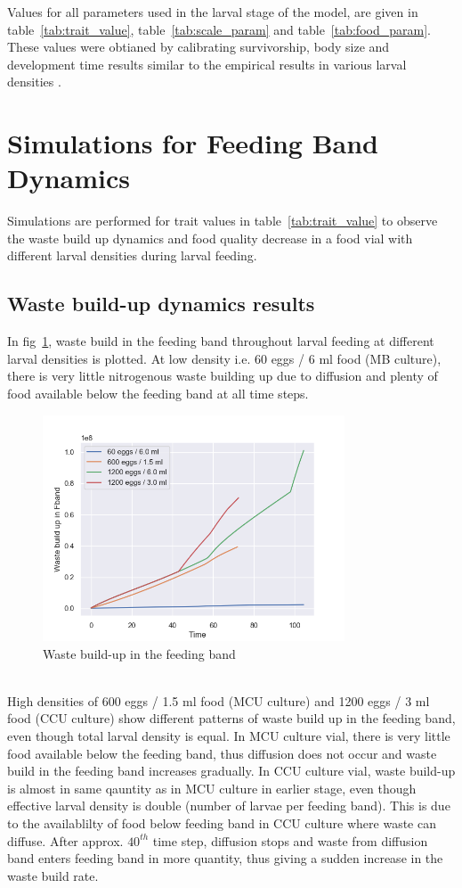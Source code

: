 \noindent Values for all parameters used in the larval stage of the model, are given in table~\ref{tab:trait_value}, table~\ref{tab:scale_param} and table~\ref{tab:food_param}. These values were obtianed by calibrating survivorship, body size and development time results similar to the empirical results in various larval densities \citep{sarangiEcologicalDetailsMediate2018}.
\clearpage
\section{Simulations for Feeding Band Dynamics}
Simulations are performed for trait values in table~\ref{tab:trait_value} to observe the waste build up dynamics and food quality decrease in a food vial with different larval densities during larval feeding.
\subsection{Waste build-up dynamics results}
In fig~\ref{fig:waste}, waste build in the feeding band throughout larval feeding at different larval densities is plotted. At low density i.e. 60 eggs / 6 ml food (MB culture), there is very little nitrogenous waste building up due to diffusion and plenty of food available below the feeding band at all time steps.
\begin{figure}[h]
  \centering
  \includegraphics[width=0.8\textwidth]{C2/Figs/waste_build_up}
  \caption{Waste build-up in the feeding band}
  \label{fig:waste}
\end{figure}\\
\noindent High densities of 600 eggs / 1.5 ml food (MCU culture) and 1200 eggs / 3 ml food (CCU culture) show different patterns of waste build up in the feeding band, even though total larval density is equal. In MCU culture vial, there is very little food available below the feeding band, thus diffusion does not occur and waste build in the feeding band increases gradually. In CCU culture vial, waste build-up is almost in same qauntity as in MCU culture in earlier stage, even though effective larval density is double (number of larvae per feeding band). This is due to the availablilty of food below feeding band in CCU culture where waste can diffuse. After approx. $40^{th}$ time step, diffusion stops and waste from diffusion band enters feeding band in more quantity, thus giving a sudden increase in the waste build rate. \\

